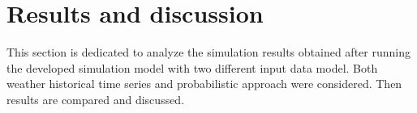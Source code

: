 \section{Results and discussion}
This section is dedicated to analyze the simulation results obtained after running the developed simulation model with two different input data model. Both weather historical time series and probabilistic approach were considered. Then results are compared and discussed.
